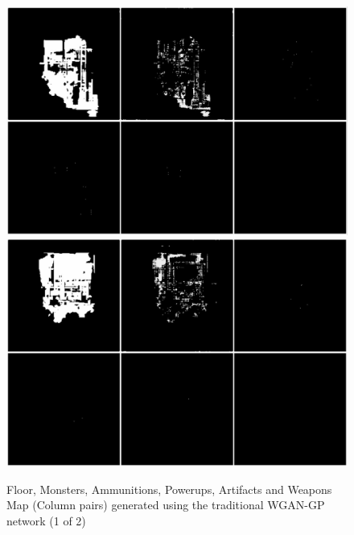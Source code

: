 \documentclass{Configuration_Files/PoliMi3i_thesis}
\begin{document}
\begin{figure}[H]
    \centering
    \includegraphics[width=1\textwidth]{wgan_sample1.jpg}
    \includegraphics[width=1\textwidth]{wgan_sample2.jpg}
    \caption[Samples generated using the traditional WGAN-GP architecture (1 of 2)]{Floor, Monsters, Ammunitions, Powerups, Artifacts and Weapons Map 
(Column pairs) generated using the traditional WGAN-GP network (1 of 2)}
    \label{fig:wgansample1}
\end{figure}
\end{document}
